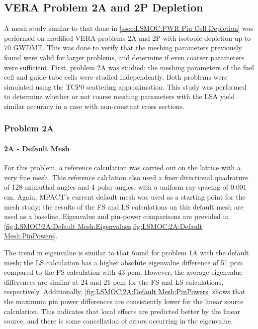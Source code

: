 {{    \subsection{VERA Problem 2A and 2P Depletion}{\label{ssec:LSMOC:VERA Problem 2A and 2P Depletion}
      A mesh study similar to that done in \cref{ssec:LSMOC:PWR Pin Cell Depletion} was performed on modified \ac{VERA} problems 2A and 2P \cite{VERAProblems} with isotopic depletion up to 70 \ac{GWDMT}.
      This was done to verify that the meshing parameters previously found were valid for larger problems, and determine if even coarser parameters were sufficient.
      First, problem 2A was studied; the meshing parameters of the fuel cell and guide-tube cells were studied independently.
      Both problems were simulated using the \ac{TCP0} scattering approximation.
      This study was performed to determine whether or not coarse meshing parameters with the \ac{LSA} yield similar accuracy in a case with non-constant cross sections.

      \subsubsection{Problem 2A}{\label{sssec:LSMOC:Problem 2A}
        \paragraph{2A - Default Mesh}{
          For this problem, a reference calculation was carried out on the lattice with a very fine mesh.
          This reference calclation also used a finer directional quadrature of 128 azimuthal angles and 4 polar angles, with a uniform ray-spacing of 0.001 cm.
          Again, MPACT's current default mesh was used as a starting point for the mesh study; the results of the \ac{FS} and \ac{LS} calculations on this default mesh are used as a baseline.
          Eigenvalue and pin-power comparisons are provided in \cref{fig:LSMOC:2A:Default Mesh:Eigenvalues,fig:LSMOC:2A:Default Mesh:PinPowers}.

          The trend in eigenvalue is similar to that found for problem 1A with the default mesh;
            the \ac{LS} calculation has a higher absolute eigenvalue difference of 51 \ac{pcm} compared to the \ac{FS} calculation with 43 \ac{pcm}.
          However, the average eigenvalue differences are similar at 24 and 21 \ac{pcm} for the \ac{FS} and \ac{LS} calculations, respectively.
          Additionally, \cref{fig:LSMOC:2A:Default Mesh:PinPowers} shows that the maximum pin power differences are consistently lower for the linear source calculation.
          This indicates that local effects are predicted better by the linear source, and there is some cancellation of errors occurring in the eigenvalue.

}}}}}
